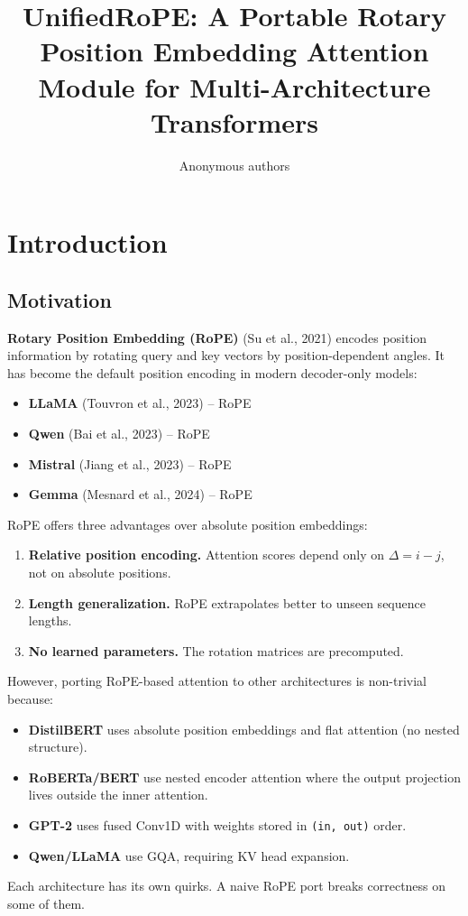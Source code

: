 \title{\textbf{UnifiedRoPE: A Portable Rotary Position Embedding Attention Module for Multi-Architecture Transformers}}

\author{Anonymous authors}



\section{Introduction}

\subsection{Motivation}

\textbf{Rotary Position Embedding (RoPE)} (Su et al., 2021) encodes position 
information by rotating query and key vectors by position-dependent angles. 
It has become the default position encoding in modern decoder-only models:

\begin{itemize}
\item \textbf{LLaMA} (Touvron et al., 2023) -- RoPE
\item \textbf{Qwen} (Bai et al., 2023) -- RoPE
\item \textbf{Mistral} (Jiang et al., 2023) -- RoPE
\item \textbf{Gemma} (Mesnard et al., 2024) -- RoPE

\end{itemize}
RoPE offers three advantages over absolute position embeddings:

\begin{enumerate}
\item \textbf{Relative position encoding.} Attention scores depend only on
  $\Delta = i - j$, not on absolute positions.
\item \textbf{Length generalization.} RoPE extrapolates better to unseen sequence
  lengths.
\item \textbf{No learned parameters.} The rotation matrices are precomputed.

\end{enumerate}
However, porting RoPE-based attention to other architectures is 
non-trivial because:

\begin{itemize}
\item \textbf{DistilBERT} uses absolute position embeddings and flat attention
  (no nested structure).
\item \textbf{RoBERTa/BERT} use nested encoder attention where the output
  projection lives outside the inner attention.
\item \textbf{GPT-2} uses fused Conv1D with weights stored in \texttt{(in, out)} order.
\item \textbf{Qwen/LLaMA} use GQA, requiring KV head expansion.

\end{itemize}
Each architecture has its own quirks. A naive RoPE port breaks correctness 
on some of them.


